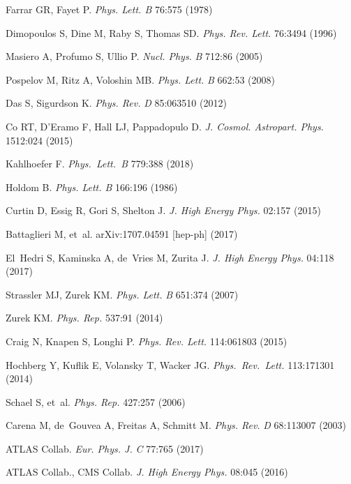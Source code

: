 \documentclass{ar-1col}
\begin{document}
{\begin{thebibliography}{175}
Farrar GR, Fayet P. \textit{Phys. Lett. B} 76:575 (1978)

Dimopoulos S, Dine M, Raby S, Thomas SD. \textit{Phys. Rev. Lett.}
76:3494 (1996)

Masiero A, Profumo S, Ullio P. \textit{Nucl. Phys.} \textit{B} 712:86 (2005)

Pospelov M, Ritz A, Voloshin MB. \textit{Phys. Lett.} \textit{B} 662:53
(2008)
  
Das S, Sigurdson K. \textit{Phys. Rev.} \textit{D} 85:063510 (2012)

Co RT, D'Eramo F, Hall LJ, Pappadopulo D. \textit{J. Cosmol. Astropart. Phys.} 1512:024
(2015)

  Kahlhoefer F. \textit{Phys.\ Lett.\ B }{779}:388 (2018)

Holdom B. \textit{Phys. Lett. B} 166:196 (1986)

Curtin D, Essig R, Gori S, Shelton J. \textit{J. High Energy Phys.} 02:157 (2015)

Battaglieri M, et~al. arXiv:1707.04591 [hep-ph] (2017)

El~Hedri S, Kaminska A, de~Vries M, Zurita J. \textit{J. High Energy Phys.} 04:118
(2017)

Strassler MJ, Zurek KM. \textit{Phys. Lett.} \textit{B} 651:374 (2007)

Zurek KM. \textit{Phys. Rep.} 537:91 (2014)

Craig N, Knapen S, Longhi P. \textit{Phys. Rev. Lett.} 114:061803
(2015)

  Hochberg Y, Kuflik E, Volansky T, Wacker JG.  \textit{Phys.\ Rev.\ Lett.}  {113}:171301 (2014)
  

Schael S, et~al. \textit{Phys. Rep.} 427:257 (2006)

Carena M, de~Gouvea A, Freitas A, Schmitt M. \textit{Phys. Rev.}
\textit{D} 68:113007 (2003)

{ATLAS Collab.} \textit{Eur. Phys. J.} \textit{C} 77:765 (2017)


{ATLAS Collab., CMS Collab}. \textit{J. High Energy Phys.} 08:045 (2016)


\end{thebibliography}}
\end{document}
